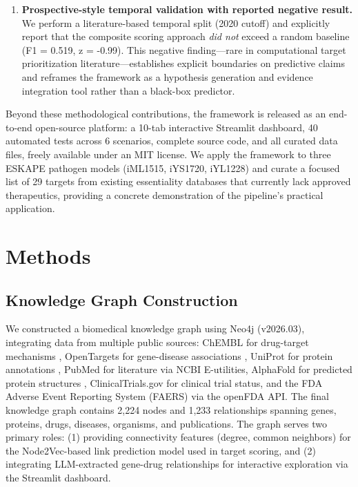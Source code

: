 \documentclass[12pt,a4paper]{article}
\begin{document}
\begin{enumerate}
    \item \textbf{Prospective-style temporal validation with reported negative result.} We perform a literature-based temporal split (2020 cutoff) and explicitly report that the composite scoring approach \textit{did not} exceed a random baseline (F1 = 0.519, z = -0.99). This negative finding---rare in computational target prioritization literature---establishes explicit boundaries on predictive claims and reframes the framework as a hypothesis generation and evidence integration tool rather than a black-box predictor.
\end{enumerate}

Beyond these methodological contributions, the framework is released as an end-to-end open-source platform: a 10-tab interactive Streamlit dashboard, 40 automated tests across 6 scenarios, complete source code, and all curated data files, freely available under an MIT license. We apply the framework to three ESKAPE pathogen models (iML1515, iYS1720, iYL1228) and curate a focused list of 29 targets from existing essentiality databases that currently lack approved therapeutics, providing a concrete demonstration of the pipeline's practical application.

\section{Methods}

\subsection{Knowledge Graph Construction}
We constructed a biomedical knowledge graph using Neo4j (v2026.03), integrating data from multiple public sources: ChEMBL for drug-target mechanisms \citep{mendez2019}, OpenTargets for gene-disease associations \citep{ochoa2021}, UniProt for protein annotations \citep{uniprot2023}, PubMed for literature via NCBI E-utilities, AlphaFold for predicted protein structures \citep{jumper2021}, ClinicalTrials.gov for clinical trial status, and the FDA Adverse Event Reporting System (FAERS) via the openFDA API. The final knowledge graph contains 2,224 nodes and 1,233 relationships spanning genes, proteins, drugs, diseases, organisms, and publications. The graph serves two primary roles: (1) providing connectivity features (degree, common neighbors) for the Node2Vec-based link prediction model used in target scoring, and (2) integrating LLM-extracted gene-drug relationships for interactive exploration via the Streamlit dashboard.
\end{document}
